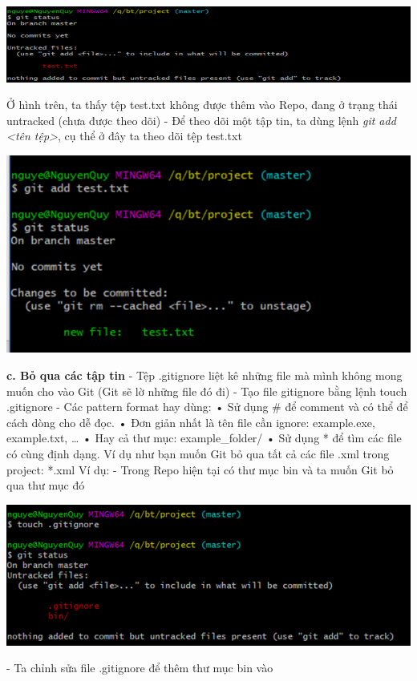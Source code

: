 \documentclass[12pt,a4paper]{report}
\begin{document}
	\includegraphics[width=0.8\linewidth]{screenshot007}

	\label{fig:screenshot007}
\vskip 0.4cm\vskip 0.4cm
Ở hình trên, ta thấy tệp test.txt không được thêm vào Repo, đang ở trạng thái untracked (chưa được theo dõi)\vskip 0.4cm
- Để theo dõi một tập tin, ta dùng lệnh {\it git add <tên tệp>}, cụ thể ở đây ta theo dõi tệp test.txt\vskip 0.4cm

	\includegraphics[width=0.8\linewidth]{screenshot008}

	\label{fig:screenshot008}
\vskip 0.4cm\vskip 0.4cm
{\bf c. Bỏ qua các tập tin} \vskip 0.4cm
- Tệp .gitignore liệt kê những file mà mình không mong muốn cho vào Git (Git sẽ lờ những file đó đi)\vskip 0.4cm
- Tạo file gitignore bằng lệnh touch .gitignore\vskip 0.4cm
- Các pattern format hay dùng:\vskip 0.4cm
•	Sử dụng \# để comment và có thể để cách dòng cho dễ đọc.\vskip 0.4cm
•	Đơn giản nhất là tên file cần ignore: example.exe, example.txt, …\vskip 0.4cm
•	Hay cả thư mục: example\_folder/\vskip 0.4cm
•	Sử dụng * để tìm các file có cùng định dạng. Ví dụ như bạn muốn Git bỏ qua tất cả các file .xml trong project: *.xml\vskip 0.4cm
Ví dụ: \vskip 0.4cm
- Trong Repo hiện tại có thư mục bin và ta muốn Git bỏ qua thư mục đó\vskip 0.4cm

	\includegraphics[width=0.8\linewidth]{screenshot009}

	\label{fig:screenshot009}
\vskip 0.4cm\vskip 0.4cm
- Ta chỉnh sửa file .gitignore để thêm thư mục bin vào\vskip 0.4cm
\end{document}
